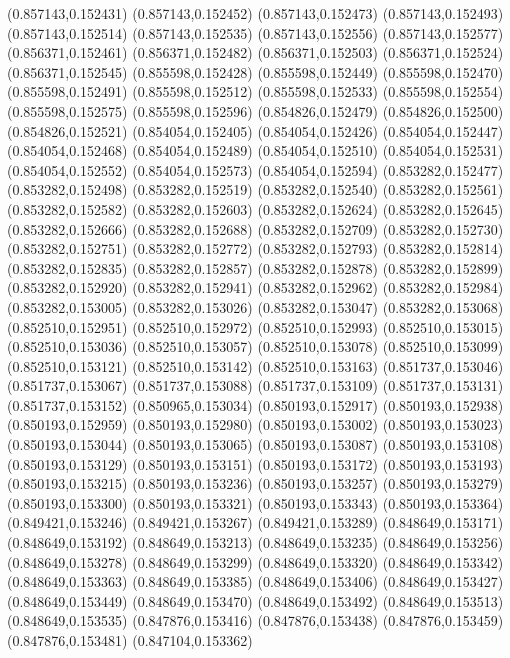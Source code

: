 (0.857143,0.152431)
(0.857143,0.152452)
(0.857143,0.152473)
(0.857143,0.152493)
(0.857143,0.152514)
(0.857143,0.152535)
(0.857143,0.152556)
(0.857143,0.152577)
(0.856371,0.152461)
(0.856371,0.152482)
(0.856371,0.152503)
(0.856371,0.152524)
(0.856371,0.152545)
(0.855598,0.152428)
(0.855598,0.152449)
(0.855598,0.152470)
(0.855598,0.152491)
(0.855598,0.152512)
(0.855598,0.152533)
(0.855598,0.152554)
(0.855598,0.152575)
(0.855598,0.152596)
(0.854826,0.152479)
(0.854826,0.152500)
(0.854826,0.152521)
(0.854054,0.152405)
(0.854054,0.152426)
(0.854054,0.152447)
(0.854054,0.152468)
(0.854054,0.152489)
(0.854054,0.152510)
(0.854054,0.152531)
(0.854054,0.152552)
(0.854054,0.152573)
(0.854054,0.152594)
(0.853282,0.152477)
(0.853282,0.152498)
(0.853282,0.152519)
(0.853282,0.152540)
(0.853282,0.152561)
(0.853282,0.152582)
(0.853282,0.152603)
(0.853282,0.152624)
(0.853282,0.152645)
(0.853282,0.152666)
(0.853282,0.152688)
(0.853282,0.152709)
(0.853282,0.152730)
(0.853282,0.152751)
(0.853282,0.152772)
(0.853282,0.152793)
(0.853282,0.152814)
(0.853282,0.152835)
(0.853282,0.152857)
(0.853282,0.152878)
(0.853282,0.152899)
(0.853282,0.152920)
(0.853282,0.152941)
(0.853282,0.152962)
(0.853282,0.152984)
(0.853282,0.153005)
(0.853282,0.153026)
(0.853282,0.153047)
(0.853282,0.153068)
(0.852510,0.152951)
(0.852510,0.152972)
(0.852510,0.152993)
(0.852510,0.153015)
(0.852510,0.153036)
(0.852510,0.153057)
(0.852510,0.153078)
(0.852510,0.153099)
(0.852510,0.153121)
(0.852510,0.153142)
(0.852510,0.153163)
(0.851737,0.153046)
(0.851737,0.153067)
(0.851737,0.153088)
(0.851737,0.153109)
(0.851737,0.153131)
(0.851737,0.153152)
(0.850965,0.153034)
(0.850193,0.152917)
(0.850193,0.152938)
(0.850193,0.152959)
(0.850193,0.152980)
(0.850193,0.153002)
(0.850193,0.153023)
(0.850193,0.153044)
(0.850193,0.153065)
(0.850193,0.153087)
(0.850193,0.153108)
(0.850193,0.153129)
(0.850193,0.153151)
(0.850193,0.153172)
(0.850193,0.153193)
(0.850193,0.153215)
(0.850193,0.153236)
(0.850193,0.153257)
(0.850193,0.153279)
(0.850193,0.153300)
(0.850193,0.153321)
(0.850193,0.153343)
(0.850193,0.153364)
(0.849421,0.153246)
(0.849421,0.153267)
(0.849421,0.153289)
(0.848649,0.153171)
(0.848649,0.153192)
(0.848649,0.153213)
(0.848649,0.153235)
(0.848649,0.153256)
(0.848649,0.153278)
(0.848649,0.153299)
(0.848649,0.153320)
(0.848649,0.153342)
(0.848649,0.153363)
(0.848649,0.153385)
(0.848649,0.153406)
(0.848649,0.153427)
(0.848649,0.153449)
(0.848649,0.153470)
(0.848649,0.153492)
(0.848649,0.153513)
(0.848649,0.153535)
(0.847876,0.153416)
(0.847876,0.153438)
(0.847876,0.153459)
(0.847876,0.153481)
(0.847104,0.153362)
